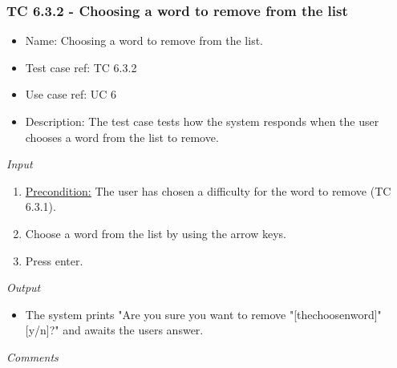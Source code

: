 \documentclass[12pt, letterpaper]{article}
\begin{document}
\subsubsection{TC 6.3.2 - Choosing a word to remove from the list}
\begin{itemize}
	\item Name: Choosing a word to remove from the list.
	\item Test case ref: TC 6.3.2
	\item Use case ref: UC 6
	\item Description: The test case tests how the system responds when the user chooses a word from the list to remove.
\end{itemize}
\emph{Input}
\begin{enumerate}
	\item \underline{Precondition:} The user has chosen a difficulty for the word to remove (TC 6.3.1).
	\item Choose a word from the list by using the arrow keys.
	\item Press enter.
\end{enumerate}
\emph{Output}
\begin{itemize}
	\item The system prints "Are you sure you want to remove "[thechoosenword]" [y/n]?" and awaits the users answer.
\end{itemize}
\begin{Form}
	\newline
	\newline
\end{Form}
\newline
\emph{Comments}
\newline
\newline
\newline
\newline
\newline
\newline
\newline
\end{document}

